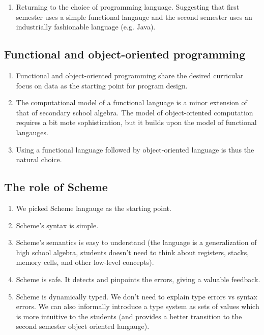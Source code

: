 \documentclass{article}
\begin{document}
\begin{enumerate}
\item Returning to the choice of programming language. Suggesting that
  first semester uses a simple functional langauge and the second
  semester uses an industrially fashionable language (e.g. Java).
\end{enumerate}

\subsection{Functional and object-oriented programming}

\begin{enumerate}
\item Functional and object-oriented programming share the desired
  curricular focus on data as the starting point for program design.
\item The computational model of a functional language is a minor
  extension of that of secondary school algebra. The model of
  object-oriented computation requires a bit mote sophistication, but
  it builds upon the model of functional langauges.
\item Using a functional language followed by object-oriented language
  is thus the natural choice.
\end{enumerate}

\subsection{The role of Scheme}

\begin{enumerate}
\item We picked Scheme langauge as the starting point.
\item Scheme's syntax is simple.
\item Scheme's semantics is easy to understand (the language is a
  generalization of high school algebra, students doesn't need to
  think about registers, stacks, memory cells, and other low-level
  concepts).
\item Scheme is safe. It detects and pinpoints the errors, giving a
  valuable feedback.
\item Scheme is dynamically typed. We don't need to explain type
  errors vs syntax errors. We can also informally introduce a type
  system as sets of values which is more intuitive to the students
  (and provides a better transition to the second semester object
  oriented langauge).
\end{enumerate}
\end{document}
